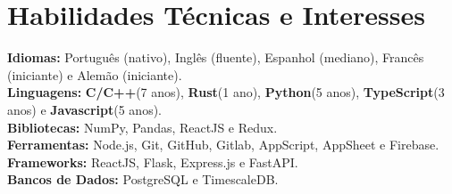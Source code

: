     \vspace{-5.5mm}
  \resumeSubHeadingListEnd
  

\section{\textbf{Habilidades Técnicas e Interesses}}
\begin{itemize}[leftmargin=0.05in, label={}]
    \small{\item{
     \textbf{Idiomas:}{ Português (nativo), Inglês (fluente), Espanhol (mediano), Francês (iniciante) e Alemão (iniciante).} \\
     \textbf{Linguagens:}{ \textbf{C/C++}(7 anos), \textbf{Rust}(1 ano), \textbf{Python}(5 anos), \textbf{TypeScript}(3 anos) e \textbf{Javascript}(5 anos). } \\
     \textbf{Bibliotecas:}{ NumPy, Pandas, ReactJS e Redux. }\\ 
     \textbf{Ferramentas:}{ Node.js, Git, GitHub,  Gitlab, AppScript, AppSheet e Firebase.} \\ 
     \textbf{Frameworks:}{ ReactJS, Flask, Express.js e FastAPI. } \\
     \textbf{Bancos de Dados:}{ PostgreSQL e TimescaleDB. } \\  
    }}
\end{itemize}


